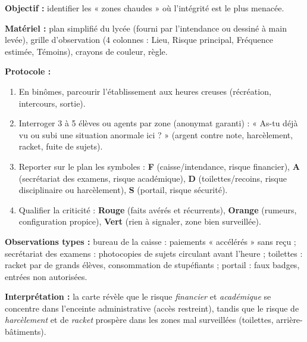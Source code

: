 \documentclass[11pt]{article}
\begin{document}
\begin{experience}
\textbf{Objectif :} identifier les « zones chaudes » où l'intégrité est le plus menacée.

\textbf{Matériel :} plan simplifié du lycée (fourni par l'intendance ou dessiné à main levée), grille d'observation (4 colonnes : Lieu, Risque principal, Fréquence estimée, Témoins), crayons de couleur, règle.

\textbf{Protocole :}
\begin{enumerate}
    \item En binômes, parcourir l'établissement aux heures creuses (récréation, intercours, sortie).
    \item Interroger 3 à 5 élèves ou agents par zone (anonymat garanti) : « As-tu déjà vu ou subi une situation anormale ici ? » (argent contre note, harcèlement, racket, fuite de sujets).
    \item Reporter sur le plan les symboles : \textbf{F} (caisse/intendance, risque financier), \textbf{A} (secrétariat des examens, risque académique), \textbf{D} (toilettes/recoins, risque disciplinaire ou harcèlement), \textbf{S} (portail, risque sécurité).
    \item Qualifier la criticité : \textbf{Rouge} (faits avérés et récurrents), \textbf{Orange} (rumeurs, configuration propice), \textbf{Vert} (rien à signaler, zone bien surveillée).
\end{enumerate}

\textbf{Observations types :} bureau de la caisse : paiements « accélérés » sans reçu ; secrétariat des examens : photocopies de sujets circulant avant l'heure ; toilettes : racket par de grands élèves, consommation de stupéfiants ; portail : faux badges, entrées non autorisées.

\textbf{Interprétation :} la carte révèle que le risque \emph{financier} et \emph{académique} se concentre dans l'enceinte administrative (accès restreint), tandis que le risque de \emph{harcèlement} et de \emph{racket} prospère dans les zones mal surveillées (toilettes, arrière-bâtiments).
\end{experience}
\end{document}
